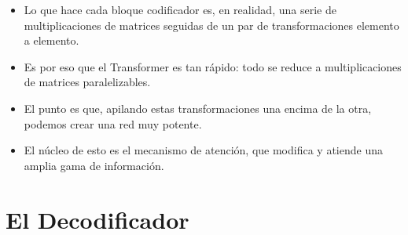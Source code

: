 \begin{itemize}

\item Lo que hace cada bloque codificador es, en realidad, una serie de multiplicaciones de matrices seguidas de un par de transformaciones elemento a elemento.

\item Es por eso que el Transformer es tan rápido: todo se reduce a multiplicaciones de matrices paralelizables.

\item El punto es que, apilando estas transformaciones una encima de la otra, podemos crear una red muy potente.

\item El núcleo de esto es el mecanismo de atención, que modifica y atiende una amplia gama de información.

\end{itemize}

\section{El Decodificador}

